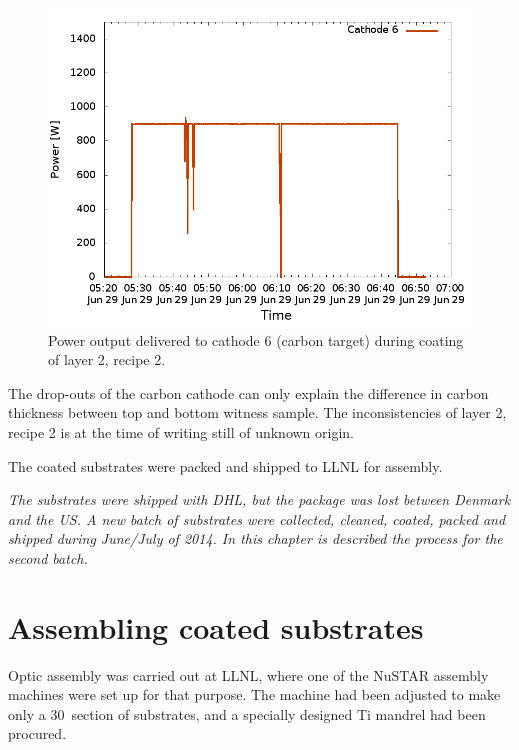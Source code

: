 \begin{figure}[!h]
  \centering  \includegraphics[width=0.7\linewidth]{figures/cast/power_cat6.png}
  \caption{\footnotesize Power output delivered to cathode 6 (carbon target) during coating of layer 2, recipe 2. }
  \label{fig:cast_coatings_power_recipe2_layer2}
\end{figure}

The drop-outs of the carbon cathode can only explain the difference in carbon thickness between top and bottom witness sample. The inconsistencies of layer 2, recipe 2 is at the time of writing still of unknown origin.

The coated substrates were packed and shipped to LLNL for assembly.

\emph{The substrates were shipped with DHL, but the package was lost between Denmark and the US. A new batch of substrates were collected, cleaned, coated, packed and shipped during June/July of 2014. In this chapter is described the process for the second batch.}

\section{Assembling coated substrates}
Optic assembly was carried out at LLNL, where one of the NuSTAR assembly machines were set up for that purpose. The machine had been adjusted to make only a 30\degr\ section of substrates, and a specially designed Ti mandrel had been procured.

